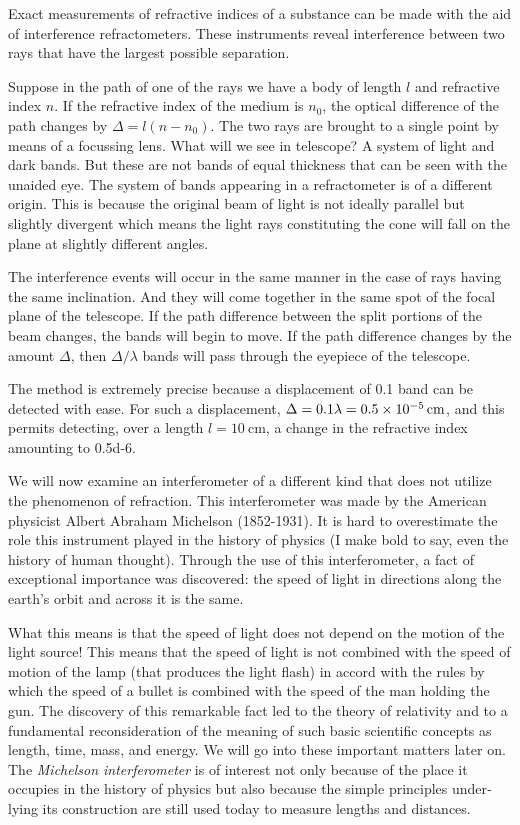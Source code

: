 Exact measurements of refractive indices of a substance can be made with the aid of interference refractometers. These instruments reveal interference between two rays that have the largest possible separation.

Suppose in the path of one of the rays we have a body of length $l$ and refractive index $n$. If the refractive index of the medium is $n_{0}$, the optical difference of the path changes by $\Delta = l(n - n_{0})$. The two rays are brought to a single point by means of a focussing lens. What will we see in telescope? A system of light and dark bands. But these are not bands of equal thickness that can be seen with the unaided eye. The system of bands appearing in a refractometer is of a different origin. This is because the original beam of light is not ideally parallel but slightly divergent which means the light rays constituting the cone will fall on the plane at slightly different angles.

The interference events will occur in the same manner in the case of rays having the same inclination. And they will come together in the same spot of the focal plane of the telescope. If the path difference between the split portions of the beam changes, the bands will begin to move. If the path difference changes by the amount $\Delta$, then $\Delta /\lambda$ bands will pass through the eyepiece of the telescope.

The method is extremely precise because a displacement of 0.1 band can be detected with ease. For such a displace­ment, $\Delta = 0.1 \lambda = \SI{0.5d-5}{\centi\metre}$, and this permits detecting, over a length $l=\SI{10}{\centi\metre}$, a change in the refractive index amounting to \num{0.5d-6}.

We will now examine an interferometer of a different kind that does not utilize the phenomenon of refraction. This interferometer was made by the American physicist Albert Abraham Michelson (1852-1931). It is hard to overestimate the role this instrument played in the histo­ry of physics (I make bold to say, even the history of human thought). Through the use of this interferometer, a fact of exceptional importance was discovered: the speed of light in directions along the earth’s orbit and across it is the same.

What this means is that the speed of light does not depend on the motion of the light source! This means that the speed of light is not combined with the speed of motion of the lamp (that produces the light flash) in accord with the rules by which the speed of a bullet is combined with the speed of the man holding the gun. The discovery of this remarkable fact led to the theory of relativity and to a fundamental reconsideration of the meaning of such basic scientific concepts as length, time, mass, and energy. We will go into these important mat­ters later on. The \emph{Michelson interferometer} is of interest not only because of the place it occupies in the history of physics but also because the simple principles under­ lying its construction are still used today to measure lengths and distances.

